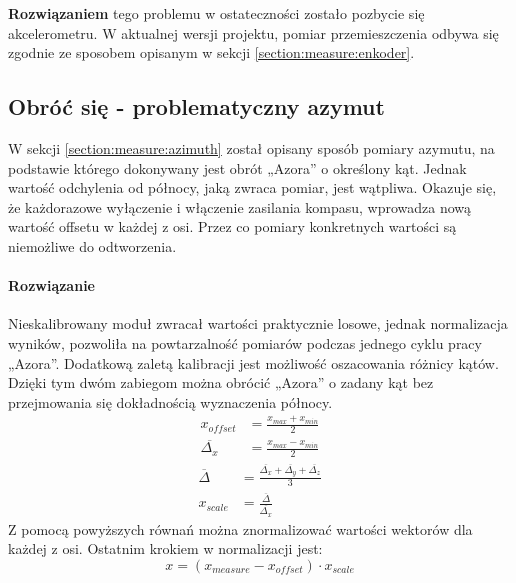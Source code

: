        \textbf{Rozwiązaniem} tego problemu w ostateczności zostało pozbycie się akcelerometru.
        W aktualnej wersji projektu, pomiar przemieszczenia odbywa się zgodnie ze sposobem opisanym w sekcji \ref{section:measure:enkoder}.


    \subsection{Obróć się - problematyczny azymut}
        W sekcji \ref{section:measure:azimuth} został opisany sposób pomiary azymutu, na podstawie którego dokonywany jest obrót „Azora” o określony kąt.
        Jednak wartość odchylenia od północy, jaką zwraca pomiar, jest wątpliwa.
        Okazuje się, że każdorazowe wyłączenie i włączenie zasilania kompasu, wprowadza nową wartość offsetu w każdej z osi.
        Przez co pomiary konkretnych wartości są niemożliwe do odtworzenia. 

        \paragraph{Rozwiązanie\\}
        Nieskalibrowany moduł zwracał wartości praktycznie losowe, jednak normalizacja wyników, pozwoliła na powtarzalność pomiarów podczas jednego cyklu pracy „Azora”.
        Dodatkową zaletą kalibracji jest możliwość oszacowania różnicy kątów.
        Dzięki tym dwóm zabiegom można obrócić „Azora” o zadany kąt bez przejmowania się dokładnością wyznaczenia północy.
        \begin{align}
            x_{offset} &= \frac{x_{max} + x_{min}}{2}\\
            \overline{\Delta_x} &=  \frac{x_{max} - x_{min}}{2}
        \end{align}
        \begin{align}
            \overline{\Delta} &= \frac{\overline{\Delta_x} + \overline{\Delta_y} + \overline{\Delta_z}}{3}\\
            x_{scale} &= \frac{\overline{\Delta}}{\overline{\Delta_x}}
        \end{align}
        Z pomocą powyższych równań można znormalizować wartości wektorów dla każdej z osi. Ostatnim krokiem w normalizacji jest:
        \begin{equation}
            x = (x_{measure} - x_{offset}) \cdot x_{scale}
        \end{equation}

